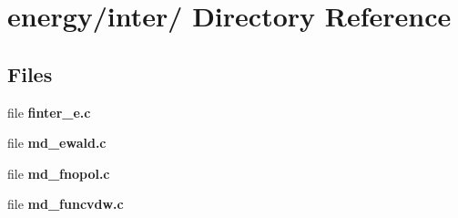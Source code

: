 \section{energy/inter/ Directory Reference}
\label{dir_e0e113da0f2511b1843da67902320438}
\subsection*{Files}
\begin{CompactItemize}
\item 
file {\bf finter\_\-e.c}
\item 
file {\bf md\_\-ewald.c}
\item 
file {\bf md\_\-fnopol.c}
\item 
file {\bf md\_\-funcvdw.c}
\end{CompactItemize}
